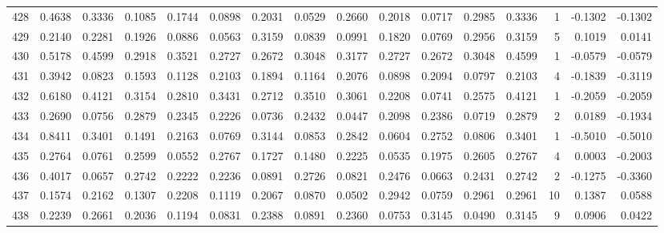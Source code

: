 \begin{tabular}{lrrrrrrrrrrrrrrr}
428 &      0.4638 &  0.3336 &  0.1085 &  0.1744 &  0.0898 &  0.2031 &  0.0529 &  0.2660 &  0.2018 &  0.0717 &   0.2985 &     0.3336 &      1 &                   -0.1302 &                    -0.1302 \\
429 &      0.2140 &  0.2281 &  0.1926 &  0.0886 &  0.0563 &  0.3159 &  0.0839 &  0.0991 &  0.1820 &  0.0769 &   0.2956 &     0.3159 &      5 &                    0.1019 &                     0.0141 \\
430 &      0.5178 &  0.4599 &  0.2918 &  0.3521 &  0.2727 &  0.2672 &  0.3048 &  0.3177 &  0.2727 &  0.2672 &   0.3048 &     0.4599 &      1 &                   -0.0579 &                    -0.0579 \\
431 &      0.3942 &  0.0823 &  0.1593 &  0.1128 &  0.2103 &  0.1894 &  0.1164 &  0.2076 &  0.0898 &  0.2094 &   0.0797 &     0.2103 &      4 &                   -0.1839 &                    -0.3119 \\
432 &      0.6180 &  0.4121 &  0.3154 &  0.2810 &  0.3431 &  0.2712 &  0.3510 &  0.3061 &  0.2208 &  0.0741 &   0.2575 &     0.4121 &      1 &                   -0.2059 &                    -0.2059 \\
433 &      0.2690 &  0.0756 &  0.2879 &  0.2345 &  0.2226 &  0.0736 &  0.2432 &  0.0447 &  0.2098 &  0.2386 &   0.0719 &     0.2879 &      2 &                    0.0189 &                    -0.1934 \\
434 &      0.8411 &  0.3401 &  0.1491 &  0.2163 &  0.0769 &  0.3144 &  0.0853 &  0.2842 &  0.0604 &  0.2752 &   0.0806 &     0.3401 &      1 &                   -0.5010 &                    -0.5010 \\
435 &      0.2764 &  0.0761 &  0.2599 &  0.0552 &  0.2767 &  0.1727 &  0.1480 &  0.2225 &  0.0535 &  0.1975 &   0.2605 &     0.2767 &      4 &                    0.0003 &                    -0.2003 \\
436 &      0.4017 &  0.0657 &  0.2742 &  0.2222 &  0.2236 &  0.0891 &  0.2726 &  0.0821 &  0.2476 &  0.0663 &   0.2431 &     0.2742 &      2 &                   -0.1275 &                    -0.3360 \\
437 &      0.1574 &  0.2162 &  0.1307 &  0.2208 &  0.1119 &  0.2067 &  0.0870 &  0.0502 &  0.2942 &  0.0759 &   0.2961 &     0.2961 &     10 &                    0.1387 &                     0.0588 \\
438 &      0.2239 &  0.2661 &  0.2036 &  0.1194 &  0.0831 &  0.2388 &  0.0891 &  0.2360 &  0.0753 &  0.3145 &   0.0490 &     0.3145 &      9 &                    0.0906 &                     0.0422 \\

\end{tabular}
